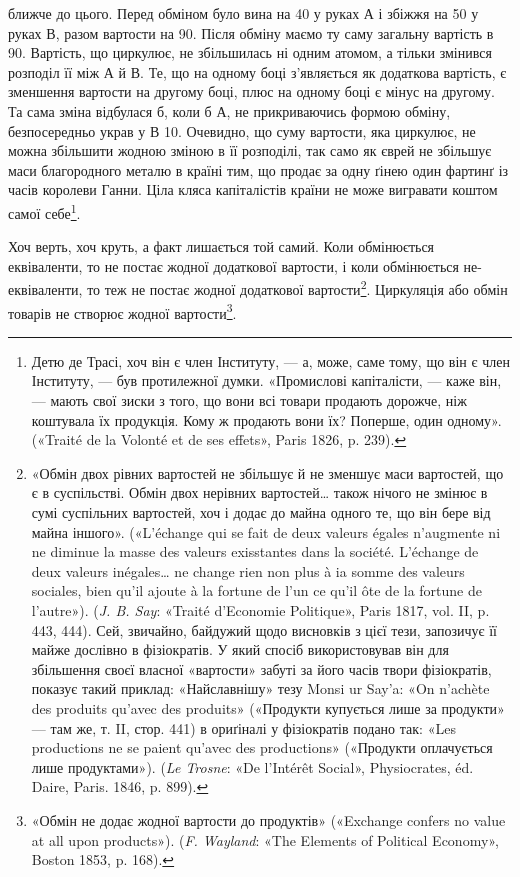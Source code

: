 \parcont{}  %
ближче до цього. Перед обміном було вина на 40
у руках $А$ і збіжжя на 50 у руках $В$, разом
вартости на 90. Після обміну маємо ту саму
загальну вартість в 90. Вартість, що циркулює,
не збільшилась ні одним атомом, а тільки змінився розподіл її
між $А$ й $В$. Те, що на одному боці з’являється як додаткова вартість,
є зменшення вартости на другому боці, плюс на одному
боці є мінус на другому. Та сама зміна відбулася б, коли б $А$, не
прикриваючись формою обміну, безпосередньо украв у $В$ 10. Очевидно, що суму вартости, яка циркулює, не
можна збільшити жодною зміною в її розподілі, так само як єврей
не збільшує маси благородного металю в країні тим, що продає
за одну ґінею один фартинґ із часів королеви Ганни. Ціла
кляса капіталістів країни не може вигравати коштом самої себе\footnote{
Детю де Трасі, хоч він є член Інституту, — а, може, саме тому,
що він є член Інституту, — був протилежної думки. «Промислові капіталісти,
— каже він, — мають свої зиски з того, що вони всі товари продають
дорожче, ніж коштувала їх продукція. Кому ж продають вони їх?
Поперше, один одному». («Traité de la Volonté et de ses effets», Paris
1826, p. 239).
}.

Хоч верть, хоч круть, а факт лишається той самий. Коли обмінюється
еквіваленти, то не постає жодної додаткової вартости,
і коли обмінюється не-еквіваленти, то теж не постає жодної додаткової
вартости\footnote{
«Обмін двох рівних вартостей не збільшує й не зменшує маси вартостей,
що є в суспільстві. Обмін двох нерівних вартостей\dots{} також нічого
не змінює в сумі суспільних вартостей, хоч і додає до майна одного те,
що він бере від майна іншого». («L’échange qui se fait de deux valeurs
égales n’augmente ni ne diminue la masse des valeurs exisstantes dans la
société. L’échange de deux valeurs inégales\dots{} ne change rien non plus à ia
somme des valeurs sociales, bien qu’il ajoute à la fortune de l’un ce qu’il
ôte de la fortune de l’autre»). (\emph{J. B. Say}: «Traité d’Economie Politique»,
Paris 1817, vol. II, p. 443, 444). Сей, звичайно, байдужий щодо висновків
з цієї тези, запозичує її майже дослівно в фізіократів. У який спосіб використовував
він для збільшення своєї власної «вартости» забуті за його
часів твори фізіократів, показує такий приклад: «Найславнішу» тезу
Monsi ur Say’a: «On n’achète des produits qu’avec des produits» («Продукти
купується лише за продукти» — там же, т. II, стор. 441) в ориґіналі
у фізіократів подано так: «Les productions ne se paient qu’avec des
productions» («Продукти оплачується лише продуктами»). (\emph{Le Trosne}:
«De l’Intérêt Social», Physiocrates, éd. Daire, Paris. 1846, p. 899).
}. Циркуляція або обмін товарів не створює
жодної вартости\footnote{
«Обмін не додає жодної вартости до продуктів» («Exchange confers
no value at all upon products»). (\emph{F. Wayland}: «The Elements of Political
Economy», Boston 1853, p. 168).
}.

